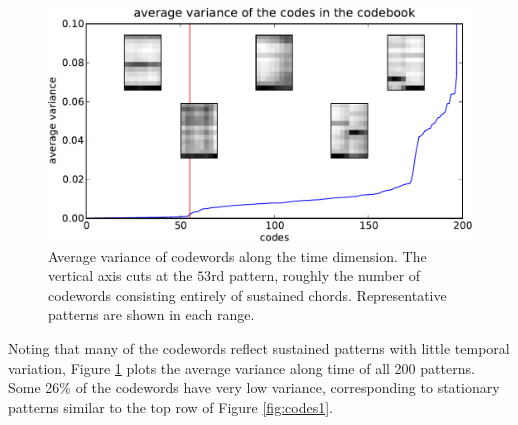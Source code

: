 \documentclass{article}
\begin{document}


\begin{figure}[t]
\begin{center}
\includegraphics[width=.9\columnwidth]{code_variance}
\end{center}
\caption{\small{Average variance of codewords along the time dimension. The vertical
axis cuts at the $53$rd pattern, roughly the number of 
codewords consisting entirely of sustained chords.  Representative patterns are shown 
in each range.
}}
\label{fig:code_var}
\end{figure}

Noting that many of the codewords reflect sustained patterns with 
little temporal variation, Figure \ref{fig:code_var} plots the average 
variance along time of all 200 patterns.  
Some 26\% of the codewords have very low variance, corresponding 
to stationary patterns similar to the top row of Figure
\ref{fig:codes1}. 
\end{document}
